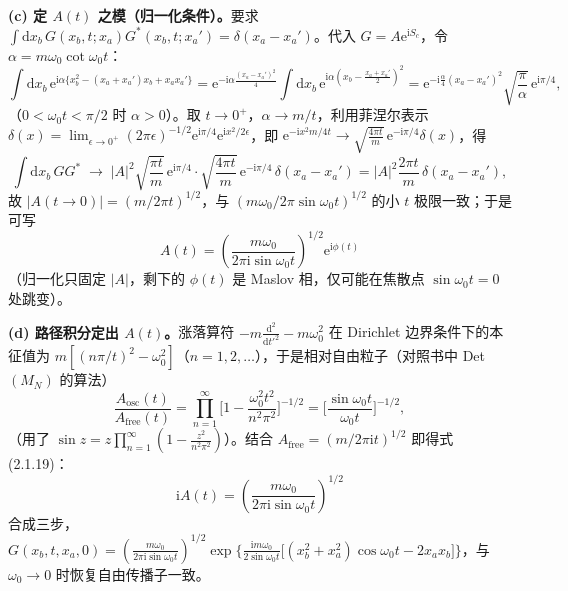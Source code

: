 \textbf{(c) 定 $A(t)$ 之模（归一化条件）。}要求 $\int\mathrm{d}x_b\,G(x_b,t;x_a)G^*(x_b,t;x_a')=\delta(x_a-x_a')$。代入 $G=A\mathrm{e}^{\mathrm{i}S_c}$，令 $\alpha=m\omega_0\cot\omega_0t$：
\begin{equation*}
\int\mathrm{d}x_b\,\mathrm{e}^{\mathrm{i}\alpha\{x_b^2-(x_a+x_a')x_b+x_ax_a'\}}
=\mathrm{e}^{-\mathrm{i}\alpha\frac{(x_a-x_a')^2}{4}}\int\mathrm{d}x_b\,\mathrm{e}^{\mathrm{i}\alpha(x_b-\frac{x_a+x_a'}2)^2}
=\mathrm{e}^{-\mathrm{i}\frac{\alpha}4(x_a-x_a')^2}\sqrt{\frac{\pi}{\alpha}}\,\mathrm{e}^{\mathrm{i}\pi/4},
\end{equation*}
（$0<\omega_0t<\pi/2$ 时 $\alpha>0$）。取 $t\to0^+$，$\alpha\to m/t$，利用菲涅尔表示 $\delta(x)=\lim_{\epsilon\to0^+}(2\pi\epsilon)^{-1/2}\mathrm{e}^{\mathrm{i}\pi/4}\mathrm{e}^{\mathrm{i}x^2/2\epsilon}$，即 $\mathrm{e}^{-\mathrm{i}x^2m/4t}\to\sqrt{\frac{4\pi t}{m}}\,\mathrm{e}^{-\mathrm{i}\pi/4}\delta(x)$，得
\begin{equation*}
\int\mathrm{d}x_b\,GG^*\;\to\;|A|^2\sqrt{\frac{\pi t}{m}}\,\mathrm{e}^{\mathrm{i}\pi/4}\cdot\sqrt{\frac{4\pi t}{m}}\,\mathrm{e}^{-\mathrm{i}\pi/4}\,\delta(x_a-x_a')
=|A|^2\frac{2\pi t}{m}\,\delta(x_a-x_a'),
\end{equation*}
故 $|A(t\to0)|=(m/2\pi t)^{1/2}$，与 $(m\omega_0/2\pi\sin\omega_0t)^{1/2}$ 的小 $t$ 极限一致；于是可写
\begin{equation*}
A(t)=\left(\frac{m\omega_0}{2\pi\mathrm{i}\sin\omega_0t}\right)^{1/2}\mathrm{e}^{\mathrm{i}\phi(t)}
\end{equation*}
（归一化只固定 $|A|$，剩下的 $\phi(t)$ 是 Maslov 相，仅可能在焦散点 $\sin\omega_0t=0$ 处跳变）。

\textbf{(d) 路径积分定出 $A(t)$。}涨落算符 $-m\frac{\mathrm{d}^2}{\mathrm{d}t'^2}-m\omega_0^2$ 在 Dirichlet 边界条件下的本征值为 $m[(n\pi/t)^2-\omega_0^2]$（$n=1,2,\dots$），于是相对自由粒子（对照书中 Det$(M_N)$ 的算法）
\begin{equation*}
\frac{A_{\text{osc}}(t)}{A_{\text{free}}(t)}
=\prod_{n=1}^{\infty}\Big[1-\frac{\omega_0^2t^2}{n^2\pi^2}\Big]^{-1/2}
=\Big[\frac{\sin\omega_0t}{\omega_0t}\Big]^{-1/2},
\end{equation*}
（用了 $\sin z=z\prod_{n=1}^\infty(1-\frac{z^2}{n^2\pi^2})$）。结合 $A_{\text{free}}=(m/2\pi\mathrm{i}t)^{1/2}$ 即得式 (2.1.19)：
\begin{equation*}
\boxed{\;\mathrm{i}A(t)=\left(\frac{m\omega_0}{2\pi\mathrm{i}\sin\omega_0t}\right)^{1/2}\;}
\end{equation*}
合成三步，$G(x_b,t,x_a,0)=\left(\frac{m\omega_0}{2\pi\mathrm{i}\sin\omega_0t}\right)^{1/2}
\exp\Big\{\frac{\mathrm{i}m\omega_0}{2\sin\omega_0t}\big[(x_b^2+x_a^2)\cos\omega_0t-2x_ax_b\big]\Big\}$，与 $\omega_0\to0$ 时恢复自由传播子一致。

